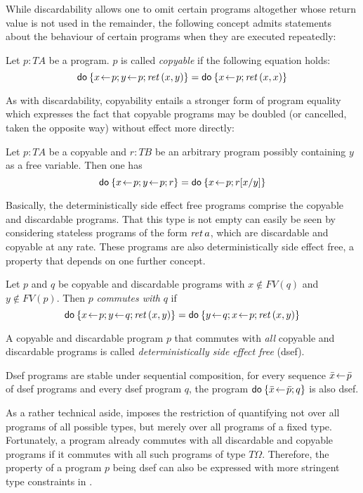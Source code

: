 While discardability allows one to omit certain programs altogether whose return
value is not used in the remainder, the following concept admits
statements about the behaviour of certain programs when they are executed
repeatedly:
\begin{defn}
  Let $p : T A$ be a program. $p$ is called \emph{copyable} if the following
  equation holds:
  \[ \mathsf{do}\: \{x\!\gets\! p; y\!\gets\! p; \mathit{ret\,} (x,y)\} = \mathsf{do}\: \{x\!\gets\! p; \mathit{ret\,} (x,x)\}
  \] 
\end{defn}
As with discardability, copyability entails a stronger form of program equality
which expresses the fact that copyable programs may be doubled (or cancelled,
taken the opposite way) without effect more directly:
\begin{prop}
  \label{thm:cp-general}
  Let $p : T A$ be a copyable and $r : T B$ be an arbitrary program possibly
  containing $y$ as a free variable. Then one has
  \[ \mathsf{do}\: \{x\!\gets\! p; y\!\gets\! p; r\} = \mathsf{do}\: \{x\!\gets\! p; r[x/y]\} \]
\end{prop}


Basically, the deterministically side effect free programs comprise the copyable
and discardable programs. That this type is not empty can easily be seen by
considering stateless programs of the form $\mathit{ret\,} a$, which are discardable and
copyable at any rate. These programs are also deterministically side effect
free, a property that depends on one further concept.
\begin{defn}
  \label{defn:commutes}
  Let $p$ and $q$ be copyable and discardable programs with $x \notin FV(q)$ and $y \notin
  FV(p)$. Then $p$ \emph{commutes with} $q$ if
  \[ \DoStmt{x\leteq p; y\leteq q; \ret (x,y)} = \DoStmt{y\leteq q; x\leteq p;
    \ret (x,y)}\]
\end{defn}

\begin{defn}
  \label{defn:dsef}
  A copyable and discardable program $p$ that commutes with \emph{all} copyable
  and discardable programs is called \emph{deterministically side effect free}
  (dsef).
\end{defn}

\begin{prop}
  Dsef programs are stable under sequential composition, \IE for every sequence
  $\bar x\!\gets\! \bar p$ of dsef programs and every dsef program $q$, the program
  $\mathsf{do}\: \{\bar x\!\gets\!\bar p; q\}$ is also dsef.
\end{prop}

As a rather technical aside, \Isabelle imposes the restriction of quantifying
not over all programs of all possible types, but merely over all programs of a
fixed type.  Fortunately, a program already commutes with all discardable and
copyable programs if it commutes with all such programs of type $T\Omega$. Therefore,
the property of a program $p$ being dsef can also be expressed with more
stringent type constraints in \Isabelle.


